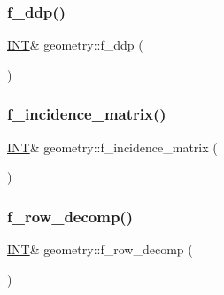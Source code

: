 \mbox{\label{classgeometry_a8facc1a86c731a6fb9d30346354987bf}} 
\subsubsection{\texorpdfstring{f\+\_\+ddp()}{f\_ddp()}}
{\footnotesize\ttfamily \mbox{\hyperlink{galois_8h_a09fddde158a3a20bd2dcadb609de11dc}{I\+NT}}\& geometry\+::f\+\_\+ddp (\begin{DoxyParamCaption}{ }\end{DoxyParamCaption})\hspace{0.3cm}{\ttfamily [inline]}}

\mbox{\label{classgeometry_a05bd36071a53d68e1c4b0ba981c9cd34}} 
\subsubsection{\texorpdfstring{f\+\_\+incidence\+\_\+matrix()}{f\_incidence\_matrix()}}
{\footnotesize\ttfamily \mbox{\hyperlink{galois_8h_a09fddde158a3a20bd2dcadb609de11dc}{I\+NT}}\& geometry\+::f\+\_\+incidence\+\_\+matrix (\begin{DoxyParamCaption}{ }\end{DoxyParamCaption})\hspace{0.3cm}{\ttfamily [inline]}}

\mbox{\label{classgeometry_a149ccf1dac87cbced60547e9608bb42d}} 
\subsubsection{\texorpdfstring{f\+\_\+row\+\_\+decomp()}{f\_row\_decomp()}}
{\footnotesize\ttfamily \mbox{\hyperlink{galois_8h_a09fddde158a3a20bd2dcadb609de11dc}{I\+NT}}\& geometry\+::f\+\_\+row\+\_\+decomp (\begin{DoxyParamCaption}{ }\end{DoxyParamCaption})\hspace{0.3cm}{\ttfamily [inline]}}

